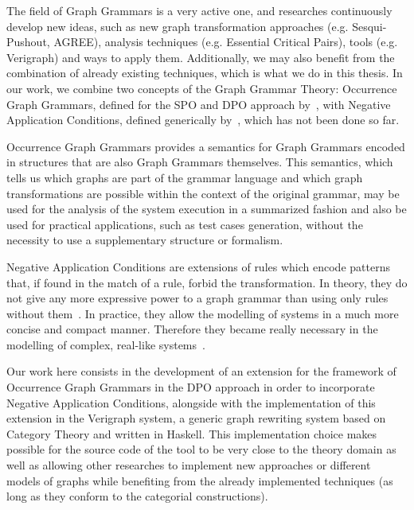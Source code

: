 The field of Graph Grammars is a very active one, and researches continuously develop new ideas, such as new graph transformation approaches (e.g. Sesqui-Pushout, AGREE), analysis techniques (e.g. Essential Critical Pairs), tools (e.g. Verigraph) and ways to apply them. Additionally, we may also benefit from the combination of already existing techniques, which is what we do in this thesis. In our work, we combine two concepts of the Graph Grammar Theory: Occurrence Graph Grammars, defined for the SPO and DPO approach by~\cite{Ribeiro1996, Corradini1996}, with Negative Application Conditions, defined generically by~\cite{Habel1996}, which has not been done so far. 

Occurrence Graph Grammars provides a semantics for Graph Grammars encoded in structures that are also Graph Grammars themselves. 
This semantics, which tells us which graphs are part of the grammar language and which graph transformations are possible within the context of the original grammar, may be used for the analysis of the system execution in a summarized fashion and also be used for practical applications, such as test cases generation, without the necessity to use a supplementary structure or formalism.

Negative Application Conditions are extensions of rules which encode patterns that, if found in the match of a rule, forbid the transformation. In theory, they do not give any more expressive power to a graph grammar than using only rules without them~\cite{Habel1996}. In practice, they allow the modelling of systems in a much more concise and compact manner. Therefore they became really necessary in the modelling of complex, real-like systems~\cite{Corradini2013, Corradini2014}.

Our work here consists in the development of an extension for the framework of Occurrence Graph Grammars in the DPO approach in order to incorporate Negative Application Conditions, alongside with the implementation of this extension in the Verigraph system, a generic graph rewriting system based on Category Theory and written in Haskell. This implementation choice makes possible for the source code of the tool to be very close to the theory domain as well as allowing other researches to implement new approaches or different models of graphs while benefiting from the already implemented techniques (as long as they conform to the categorial constructions).


